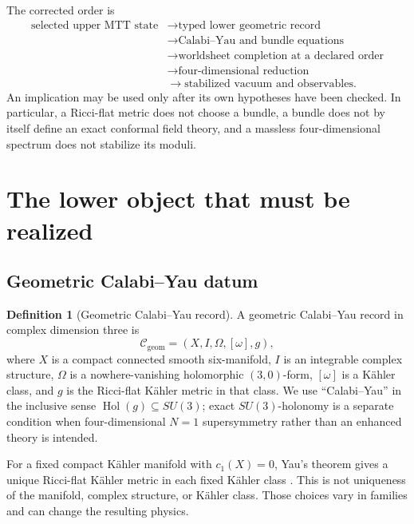 \documentclass[11pt]{article}
\theoremstyle{definition}
\newtheorem{definition}[theorem]{Definition}
\theoremstyle{remark}
\newcommand{\cC}{\mathcal C}
\begin{document}
The corrected order is
\[
\begin{split}
\text{selected upper MTT state}
&\longrightarrow \text{typed lower geometric record}\\
&\longrightarrow \text{Calabi--Yau and bundle equations}\\
&\longrightarrow \text{worldsheet completion at a declared order}\\
&\longrightarrow \text{four-dimensional reduction}\\
&\longrightarrow \text{stabilized vacuum and observables}.
\end{split}
\]
An implication may be used only after its own hypotheses have been checked.
In particular, a Ricci-flat metric does not choose a bundle, a bundle does not
by itself define an exact conformal field theory, and a massless
four-dimensional spectrum does not stabilize its moduli.

\section{The lower object that must be realized}
\label{sec:lower}

\subsection{Geometric Calabi--Yau datum}

\begin{definition}[Geometric Calabi--Yau record]
\label{def:cy-record}
A geometric Calabi--Yau record in complex dimension three is
\[
\cC_{\mathrm{geom}}
  =(X,I,\Omega,[\omega],g),
\]
where \(X\) is a compact connected smooth six-manifold, \(I\) is an
integrable complex structure, \(\Omega\) is a nowhere-vanishing holomorphic
\((3,0)\)-form, \([\omega]\) is a K\"ahler class, and \(g\) is the
Ricci-flat K\"ahler metric in that class.  We use ``Calabi--Yau'' in the
inclusive sense \(\operatorname{Hol}(g)\subseteq SU(3)\); exact
\(SU(3)\)-holonomy is a separate condition when four-dimensional
\(N=1\) supersymmetry rather than an enhanced theory is intended.
\end{definition}

For a fixed compact K\"ahler manifold with \(c_1(X)=0\), Yau's theorem gives a
unique Ricci-flat K\"ahler metric in each fixed K\"ahler class
\cite{Yau1978}.  This is not uniqueness of the manifold, complex structure,
or K\"ahler class.  Those choices vary in families and can change the
resulting physics.
\end{document}
